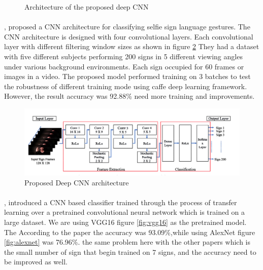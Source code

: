 \documentclass[12pt]{report}
\begin{document}
\begin{figure}
\begin{subfigure}[b]{0.3\textwidth}
                        \end{subfigure}
                        \caption{Architecture of the proposed deep CNN }\label{fig:tiny_architecture}
                    \end{figure}

                \newpage

            \paragraph{}
                \cite{Rao2018}, proposed a CNN architecture for classifying selfie sign language gestures. 
                The CNN architecture is designed with four convolutional layers. Each convolutional 
                layer with different filtering window sizes as shown in figure \ref{fig:selfie}  
                They had a dataset with five different subjects performing 200 signs in 5 different viewing angles 
                under various background environments. Each sign occupied for 60 frames or images in a video.
                The proposed model performed training on 3 batches to test the robustness of different training mode 
                using caffe deep learning framework. However, the result accuracy was 92.88\% need more training and improvements. 
    
                    \begin{figure}[h]
                        \centering
                        \includegraphics[width=\textwidth]{./images/selfie.png}
                        \caption{Proposed Deep CNN architecture}
                        \label{fig:selfie}
                    \end{figure}

                 \newpage
            
            \paragraph{}
                \cite{Hussain2017}, introduced a CNN based classifier  trained through the process of transfer learning
                over a pretrained convolutional neural network which is trained on a large dataset.
                We are using VGG16 figure \ref{fig:vgg16} as the pretrained model.
                The According to the paper the accuracy was 93.09\%,while using AlexNet 
                figure \ref{fig:alexnet} was 76.96\%. the same problem here with the other papers 
                which is the small number of sign that begin trained on 7 signs, and the accuracy
                need to be improved as well.
\end{document}
